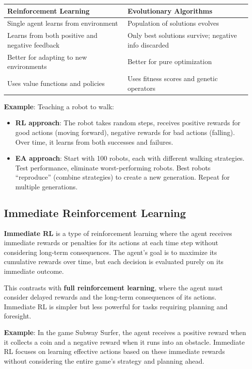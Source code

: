 \documentclass[11pt,a4paper]{article}
\begin{document}
\begin{center}
\begin{tabular}{|l|l|}
\hline
\textbf{Reinforcement Learning} & \textbf{Evolutionary Algorithms} \\ \hline
Single agent learns from environment & Population of solutions evolves \\ \hline
Learns from both positive and negative feedback & Only best solutions survive; negative info discarded \\ \hline
Better for adapting to new environments & Better for pure optimization \\ \hline
Uses value functions and policies & Uses fitness scores and genetic operators \\ \hline
\end{tabular}
\end{center}

\textbf{Example}: Teaching a robot to walk:
\begin{itemize}
    \item \textbf{RL approach}: The robot takes random steps, receives positive rewards for good actions (moving forward), negative rewards for bad actions (falling). Over time, it learns from both successes and failures.
    \item \textbf{EA approach}: Start with 100 robots, each with different walking strategies. Test performance, eliminate worst-performing robots. Best robots ``reproduce'' (combine strategies) to create a new generation. Repeat for multiple generations.
\end{itemize}

\subsection{Immediate Reinforcement Learning}

\textbf{Immediate RL} is a type of reinforcement learning where the agent receives immediate rewards or penalties for its actions at each time step without considering long-term consequences. The agent's goal is to maximize its cumulative rewards over time, but each decision is evaluated purely on its immediate outcome.

This contrasts with \textbf{full reinforcement learning}, where the agent must consider delayed rewards and the long-term consequences of its actions. Immediate RL is simpler but less powerful for tasks requiring planning and foresight.

\textbf{Example}: In the game Subway Surfer, the agent receives a positive reward when it collects a coin and a negative reward when it runs into an obstacle. Immediate RL focuses on learning effective actions based on these immediate rewards without considering the entire game's strategy and planning ahead.
\end{document}
